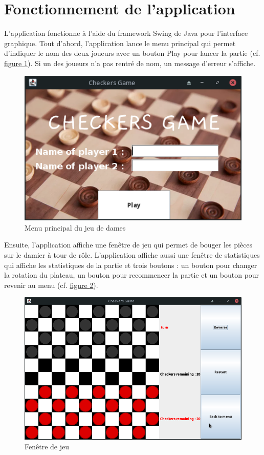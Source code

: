 \section{Fonctionnement de l'application}

L'application fonctionne à l'aide du framework Swing de Java pour l'interface graphique.
Tout d'abord, l'application lance le menu principal qui permet d'indiquer le nom des deux joueurs 
avec un bouton Play pour lancer la partie (cf. \hyperref[f:menuPrincipal]{figure \ref{f:menuPrincipal}}).
Si un des joueurs n'a pas rentré de nom, un message d'erreur s'affiche. \medskip

\begin{figure}[H]
    \centering
    \includegraphics[width=0.8\columnwidth]{figures/mainMenu.png}
    \caption[Menu principal du jeu de dames]{Menu principal du jeu de dames}
    \label{f:menuPrincipal}
\end{figure}

Ensuite, l'application affiche une fenêtre de jeu qui permet de bouger les pièces sur le damier à tour de rôle.
L'application affiche aussi une fenêtre de statistiques qui affiche les statistiques de la partie 
et trois boutons : un bouton pour changer la rotation du plateau, un bouton pour recommencer la partie et un bouton 
pour revenir au menu (cf. \hyperref[f:fenetrePrincipale]{figure \ref{f:fenetrePrincipale}}). 

\begin{figure}[H]
    \centering
    \includegraphics[width=1\columnwidth]{figures/boardGame.png}
    \caption[Fenêtre de jeu]{Fenêtre de jeu}
    \label{f:fenetrePrincipale}
\end{figure}

